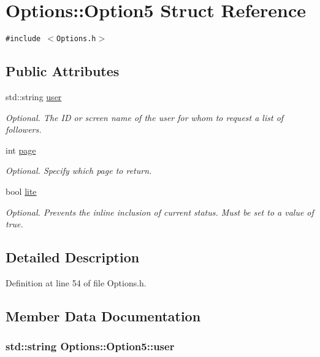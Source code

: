 \hypertarget{structOptions_1_1Option5}{
\section{Options::Option5 Struct Reference}
\label{structOptions_1_1Option5}
}
{\tt \#include $<$Options.h$>$}

\subsection*{Public Attributes}
\begin{CompactItemize}
\item 
std::string \hyperlink{structOptions_1_1Option5_a25a8982d83613afaa800e77ba74fa3b}{user}
\begin{CompactList}\small\item\em Optional. The ID or screen name of the user for whom to request a list of followers. \item\end{CompactList}\item 
int \hyperlink{structOptions_1_1Option5_9a0ff1b77d61ebe305785b966f575443}{page}
\begin{CompactList}\small\item\em Optional. Specify which page to return. \item\end{CompactList}\item 
bool \hyperlink{structOptions_1_1Option5_5df7cf9115786b7e47f955d54ea0aae5}{lite}
\begin{CompactList}\small\item\em Optional. Prevents the inline inclusion of current status. Must be set to a value of true. \item\end{CompactList}\end{CompactItemize}


\subsection{Detailed Description}


Definition at line 54 of file Options.h.

\subsection{Member Data Documentation}
\hypertarget{structOptions_1_1Option5_a25a8982d83613afaa800e77ba74fa3b}{
\subsubsection{\setlength{\rightskip}{0pt plus 5cm}std::string {\bf Options::Option5::user}}}
\label{structOptions_1_1Option5_a25a8982d83613afaa800e77ba74fa3b}


